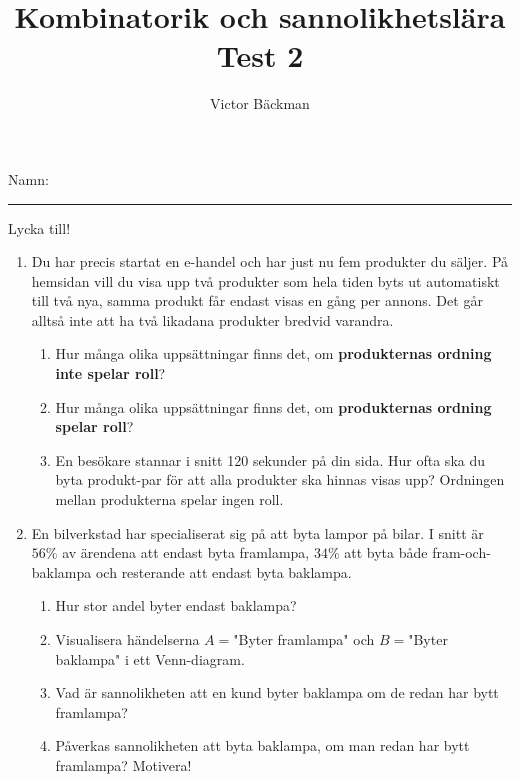 \documentclass[a4paper,10pt]{article}
\title{Kombinatorik och sannolikhetslära \\ {\large Test 2}}
\author{Victor Bäckman}
\begin{document}
\maketitle
\vspace{2cm}
Namn:
{\rule{13cm}{0.4pt}}
\vspace{8cm}
\begin{center}
  {\huge Lycka till!}
\end{center}
\newpage
\begin{enumerate}
  \item{Du har precis startat en e-handel och har just nu fem produkter du säljer. På hemsidan vill du visa upp   två produkter som hela tiden byts ut automatiskt till två nya, samma produkt får endast visas en gång per annons. Det går alltså inte att ha två likadana produkter bredvid varandra.}
    \begin{enumerate}
      \item{Hur många olika uppsättningar finns det, om {\bf produkternas ordning inte spelar roll}?}
      \vspace{6cm}
      \item{Hur många olika uppsättningar finns det, om {\bf produkternas ordning spelar roll}?}
      \vspace{6cm}
      \item{En besökare stannar i snitt 120 sekunder på din sida. Hur ofta ska du byta produkt-par för att alla produkter ska hinnas visas upp? Ordningen mellan produkterna spelar ingen roll.}
    \end{enumerate}
    \newpage
  \item{En bilverkstad har specialiserat sig på att byta lampor på bilar. I snitt är $56\%$ av ärendena att endast byta framlampa, $34\%$ att byta både fram-och-baklampa och resterande att endast byta baklampa.}
    \begin{enumerate}
        \item{Hur stor andel byter endast baklampa?}
        \vspace{2cm}
        \item{Visualisera händelserna $A=$"Byter framlampa" och $B=$"Byter baklampa" i ett Venn-diagram.}
        \vspace{5cm}
        \item{Vad är sannolikheten att en kund byter baklampa om de redan har bytt framlampa?}
        \vspace{5cm}
        \item{Påverkas sannolikheten att byta baklampa, om man redan har bytt framlampa? Motivera!}

\end{enumerate}
\end{enumerate}
\end{document}
